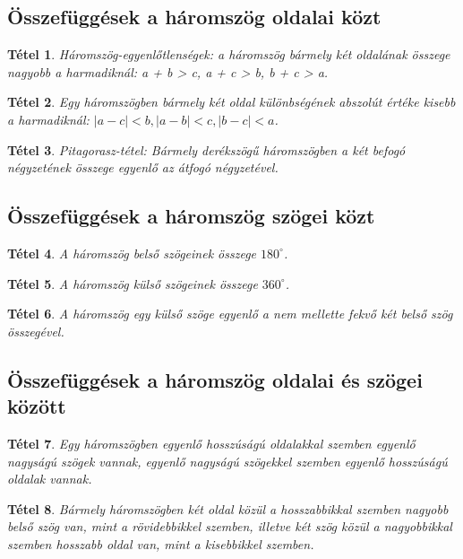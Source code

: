 \documentclass[12pt,a4paper]{article}
\newtheorem{theorem}{Tétel} [section]
\begin{document}
\subsection{Összefüggések a háromszög oldalai közt}

\begin{theorem}
Háromszög-egyenlőtlenségek: a háromszög bármely két oldalának összege nagyobb a harmadiknál: a + b > c, a + c > b, b + c > a.
\end{theorem}

\begin{theorem}
Egy háromszögben bármely két oldal különbségének abszolút értéke kisebb a harmadiknál: $|a - c|< b, |a - b|< c, |b - c|< a$.
\end{theorem}

\begin{theorem}
Pitagorasz-tétel: Bármely derékszögű háromszögben a két befogó négyzetének összege egyenlő az átfogó négyzetével.
\end{theorem}

\subsection{Összefüggések a háromszög szögei közt}

\begin{theorem}
A háromszög belső szögeinek összege $180^\circ$.
\end{theorem}

\begin{theorem}
A háromszög külső szögeinek összege $360^\circ$.
\end{theorem}

\begin{theorem}
A háromszög egy külső szöge egyenlő a nem mellette fekvő két belső szög összegével.
\end{theorem}
\newpage
\subsection{Összefüggések a háromszög oldalai és szögei között}

\begin{theorem}
Egy háromszögben egyenlő hosszúságú oldalakkal szemben egyenlő nagyságú szögek vannak, egyenlő nagyságú szögekkel szemben egyenlő hosszúságú oldalak vannak.
\end{theorem}

\begin{theorem}
Bármely háromszögben két oldal közül a hosszabbikkal szemben nagyobb belső szög van, mint a rövidebbikkel szemben, illetve két szög közül a nagyobbikkal szemben hosszabb oldal van, mint a kisebbikkel szemben.
\end{theorem}
\end{document}
